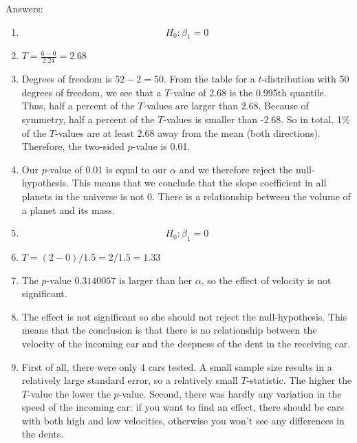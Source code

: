 \documentclass[]{report}\usepackage[]{graphicx}\usepackage[]{color}
\begin{document}
Answers:

\begin{enumerate}

\item

\begin{equation}
H_0: \beta_1 = 0
\end{equation}



\item $T= \frac{6 - 0}{2.24}= 2.68 $

\item

Degrees of freedom is $52-2=50$. From the table for a $t$-distribution with 50 degrees of freedom, we see that a $T$-value of 2.68 is the 0.995th quantile. Thus, half a percent of the $T$-values are larger than 2.68. Because of symmetry, half a percent of the $T$-values is smaller than -2.68. So in total, 1\% of the $T$-values are at least 2.68 away from the mean (both directions). Therefore, the two-sided $p$-value is 0.01.

\item Our $p$-value of 0.01 is equal to our $\alpha$ and we therefore reject the null-hypothesis. This means that we conclude that the slope coefficient in all planets in the universe is not 0. There is a relationship between the volume of a planet and its mass.

\item

\begin{equation}
H_0: \beta_1= 0
\end{equation}

\item
$T= (2-0)/1.5=2/1.5=1.33$

\item
The $p$-value $0.3140057$ is larger than her $\alpha$, so the effect of velocity is not significant.

\item
 The effect is not significant so she should not reject the null-hypothesis. This means that the conclusion is that there is no relationship between the velocity of the incoming car and the deepness of the dent in the receiving car.

\item First of all, there were only 4 cars tested. A small sample size results in a relatively large standard error, so a relatively small $T$-statistic. The higher the $T$-value the lower the $p$-value. Second, there was hardly any variation in the speed of the incoming car: if you want to find an effect, there should be cars with both high and low velocities, otherwise you won't see any differences in the dents.

\end{enumerate}
\end{document}
